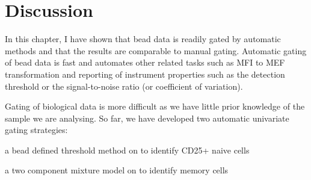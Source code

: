 \section{Discussion}

%
In this chapter, I have shown that bead data is readily gated by automatic methods and that the results are comparable to manual gating.
Automatic gating of bead data is fast and automates other related tasks such as MFI to MEF transformation
and reporting of instrument properties such as the detection threshold or the signal-to-noise ratio (or coefficient of variation).

Gating of biological data is more difficult as we have little prior knowledge of the sample we are analysing.
So far, we have developed two automatic univariate gating strategies:
\begin{itemise}
\item a bead defined threshold method on  to identify CD25+ naive cells
\item a two component mixture model on  to identify memory cells
\end{itemise}

